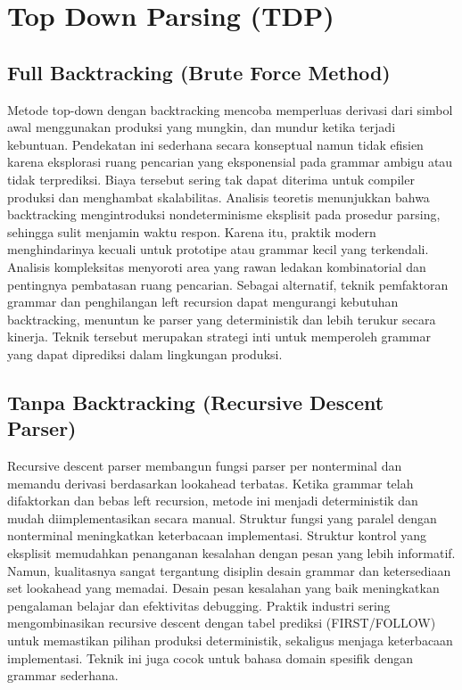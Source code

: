 \documentclass[../main.tex]{subfiles}
\begin{document}
\chapter{Top Down Parsing (TDP)}
\label{ch:tdp}

\section{Full Backtracking (Brute Force Method)}
Metode top-down dengan backtracking mencoba memperluas derivasi dari simbol awal menggunakan produksi yang mungkin, dan mundur ketika terjadi kebuntuan. Pendekatan ini sederhana secara konseptual namun tidak efisien karena eksplorasi ruang pencarian yang eksponensial pada grammar ambigu atau tidak terprediksi.\cite{aho-dragon-book-2006} Biaya tersebut sering tak dapat diterima untuk compiler produksi dan menghambat skalabilitas.
Analisis teoretis menunjukkan bahwa backtracking mengintroduksi nondeterminisme eksplisit pada prosedur parsing, sehingga sulit menjamin waktu respon. Karena itu, praktik modern menghindarinya kecuali untuk prototipe atau grammar kecil yang terkendali.\cite{parr-rl} Analisis kompleksitas menyoroti area yang rawan ledakan kombinatorial dan pentingnya pembatasan ruang pencarian.\cite{grune-parsing}
Sebagai alternatif, teknik pemfaktoran grammar dan penghilangan left recursion dapat mengurangi kebutuhan backtracking, menuntun ke parser yang deterministik dan lebih terukur secara kinerja. Teknik tersebut merupakan strategi inti untuk memperoleh grammar yang dapat diprediksi dalam lingkungan produksi.

\section{Tanpa Backtracking (Recursive Descent Parser)}
Recursive descent parser membangun fungsi parser per nonterminal dan memandu derivasi berdasarkan lookahead terbatas. Ketika grammar telah difaktorkan dan bebas left recursion, metode ini menjadi deterministik dan mudah diimplementasikan secara manual.\cite{parr-antlr} Struktur fungsi yang paralel dengan nonterminal meningkatkan keterbacaan implementasi.
Struktur kontrol yang eksplisit memudahkan penanganan kesalahan dengan pesan yang lebih informatif. Namun, kualitasnya sangat tergantung disiplin desain grammar dan ketersediaan set lookahead yang memadai.\cite{aho-dragon-book-2006} Desain pesan kesalahan yang baik meningkatkan pengalaman belajar dan efektivitas debugging.
Praktik industri sering mengombinasikan recursive descent dengan tabel prediksi (FIRST/FOLLOW) untuk memastikan pilihan produksi deterministik, sekaligus menjaga keterbacaan implementasi. Teknik ini juga cocok untuk bahasa domain spesifik dengan grammar sederhana.\cite{grune-parsing}

\IfSubfilesClassLoaded{%
\printbibliography
}{}
\end{document}
